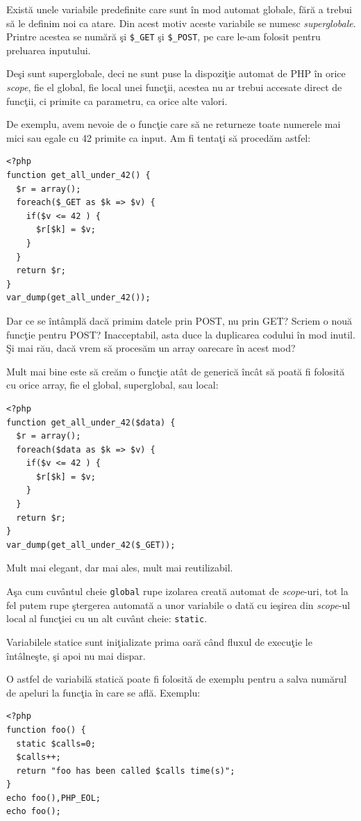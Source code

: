 
Există unele variabile predefinite care sunt în mod automat
globale, fără a trebui să le definim noi ca atare. Din acest
motiv aceste variabile se numesc \textsl{superglobale}.
Printre acestea se numără şi \texttt{\$\_GET} şi
\texttt{\$\_POST}, pe care le-am folosit pentru
preluarea inputului.

Deşi sunt superglobale, deci ne sunt puse la dispoziţie
automat de PHP în orice \textit{scope}, fie el global,
fie local unei funcţii, acestea nu ar trebui accesate direct
de funcţii, ci primite ca parametru, ca orice alte valori.

De exemplu, avem nevoie de o funcţie care să ne returneze
toate numerele mai mici sau egale cu 42 primite ca input.
Am fi tentaţi să procedăm astfel:
\begin{lstlisting}
<?php
function get_all_under_42() {
  $r = array();
  foreach($_GET as $k => $v) {
	if($v <= 42 ) {
	  $r[$k] = $v;
	}
  }
  return $r;
}
var_dump(get_all_under_42());
\end{lstlisting}
Dar ce se întâmplă dacă primim datele prin POST, nu prin GET?
Scriem o nouă funcţie pentru POST? Inacceptabil, asta duce
la duplicarea codului în mod inutil. Şi mai rău, dacă
vrem să procesăm un array oarecare în acest mod?

Mult mai bine este să creăm o funcţie atât de generică încât
să poată fi folosită cu orice array, fie el global,
superglobal, sau local:
\begin{lstlisting}
<?php
function get_all_under_42($data) {
  $r = array();
  foreach($data as $k => $v) {
	if($v <= 42 ) {
	  $r[$k] = $v;
	}
  }
  return $r;
}
var_dump(get_all_under_42($_GET));
\end{lstlisting}
Mult mai elegant, dar mai ales, mult mai
reutilizabil.

Aşa cum cuvântul cheie \texttt{global} rupe izolarea creată
automat de \textit{scope}-uri, tot la fel putem rupe ştergerea
automată a unor variabile o dată cu ieşirea din \textit{scope}-ul local
al funcţiei cu un alt cuvânt cheie: \texttt{static}.

Variabilele statice sunt iniţializate prima oară când fluxul
de execuţie le întâlneşte, şi apoi nu mai dispar.

O astfel de variabilă statică poate fi folosită de exemplu
pentru a salva numărul de apeluri la funcţia în care se află. Exemplu:
\begin{lstlisting}
<?php
function foo() {
  static $calls=0;
  $calls++;
  return "foo has been called $calls time(s)";
}
echo foo(),PHP_EOL;
echo foo();
\end{lstlisting}

